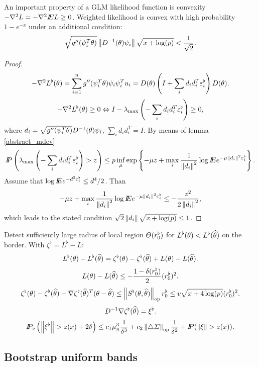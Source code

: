 An important property of a GLM likelihood function is convexity $ -\nabla^2 L = -\nabla^2 I\!\!E L \geq 0$. Weighted likelihood is convex with high probability  $1 - e^{-x}$ under an additional condition:
\[
\sqrt{g''(\psi_i^{T} \theta)} \left\Vert D^{-1}(\theta) \psi_i  \right\Vert \sqrt{x + \log(p)}  < \frac{1}{\sqrt{2}}.
\] 
\begin{proof}
\[
 - \nabla^2 L^{\flat}(\theta) = \sum_{i=1}^n g''(\psi_i^{T} \theta) \psi_i \psi_i^{T} u_i = D(\theta) \left( I + \sum_i d_i d_i^{T} \varepsilon_i^{\flat} \right) D(\theta).
\]
\[
 - \nabla^2 L^{\flat}(\theta)  \geq 0  \Leftrightarrow I - \lambda_{\max} \left( - \sum_i d_i d_i^{T} \varepsilon_i^{\flat} \right) \geq 0,
\]
where $d_i = \sqrt{g''(\psi_i^{T} \theta)} D^{-1}(\theta) \psi_i$, $\sum_i d_i d_i^{T} = I$. By means of lemma \ref{abstract_mdev} 
\[
I\!\!P \left( \lambda_{\max} \left( - \sum_i d_i d_i^{T} \varepsilon_i^{\flat} \right) > z \right) \leq 
p \inf_{\mu} \exp \left\{ -\mu z + \max_i \frac{1}{\left\Vert d_i \right\Vert^2} \log I\!\!E e^{ - \mu \left\Vert d_i \right\Vert^2 \varepsilon_i^{\flat} } \right\}.
\]
Assume that $\log I\!\!E e^{ - d^2 \varepsilon_i^{\flat} } \leq d^4 / 2$. Than
\[
-\mu z + \max_i \frac{1}{\left\Vert d_i \right\Vert^2} \log I\!\!E e^{ - \mu \left\Vert d_i \right\Vert^2 \varepsilon_i^{\flat} } \leq 
-\frac{z^2}{2 \left\Vert d_i \right\Vert^2},
\]
which leads to the stated condition $\sqrt{2} \left\Vert d_i \right\Vert \sqrt{x + \log(p)} \leq 1$.

\end{proof}

Detect sufficiently large radius of local region  $\Theta(\rb0)$ for $L^{\flat}(\theta) < L^{\flat}(\widehat{\theta})$ on the border. With $\zeta^{\flat} = L^{\flat} - L$: 
\[
L^{\flat}(\theta) - L^{\flat}(\widehat{\theta}) = \zeta^{\flat} (\theta) - \zeta^{\flat}(\widehat{\theta}) + L(\theta) - L(\widehat{\theta}). 
\]  
\[
\Lf - \Lfopt \leq -  \frac{1 - \delta(\rb0)}{2} (\rb0)^{2}. 
\]
\[
\zeta^{\flat} (\theta) - \zeta^{\flat}(\widehat{\theta}) - \nabla \zeta^{\flat}(\widehat{\theta})^{T} (\theta - \opttheta) \leq \normop{S^{\flat}(\theta, \opttheta)} \rb0    \leq  v \sqrt{x + 4 \log (p)} (\rb0)^{2}.
\]
\[
D^{-1} \nabla \zeta^{\flat}(\widehat{\theta}) = \xi^{\flat}.
\]
\[
I\!\!P_{\hspace{1pt} \flat} \left(\left\Vert \xi^{\flat} \right\Vert > z(x) + 2\delta \right) \leq  c_1 \mu_n^3 \frac{1}{\delta^3} + c_2 \left\Vert \triangle \varSigma \right\Vert_{\operatorname{op}} \frac{1}{\delta^2} + I\!\!P(\left\Vert \xi \right\Vert > z(x)) .
\]


\subsection{Bootstrap uniform bands}

